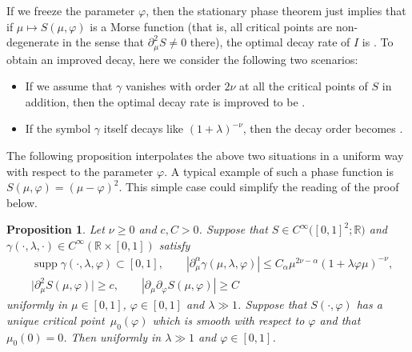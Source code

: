 \documentclass[10pt,a4paper]{amsart}
\numberwithin{equation}{section}
\newtheorem{Proposition}[Theorem]{Proposition}
 { \theoremstyle{definition}
\newtheorem{Definition}[Theorem]{Definition}
\newtheorem{Note}[Theorem]{Note}
\newtheorem{Example}[Theorem]{Example}
\newtheorem{Remark}[Theorem]{Remark} }
\def\R{\mathbb{R}}%
\DeclareMathOperator{\supp}{supp}%
\def\a{\alpha}
\def\c{\gamma}
\def\f{\varphi}
\def\l{\lambda}
\def\m{\mu}
\def\n{\nu}
\def\pa{\partial}
\begin{document}
If we freeze the parameter $\f$, then the stationary phase theorem just implies that if $\m\mapsto S(\m,\f)$ is a Morse function (that is, all critical points are non-degenerate in the sense that $\pa_{\m}^2S\neq 0$ there), the optimal decay rate of $I$ is \smash{$\l^{-\frac{1}{2}}$}. To obtain an improved decay, here we consider the following two scenarios:
\begin{itemize}\itemsep=0pt
\item If we assume that $\c$ vanishes with order $2\n$ at all the critical points of $S$ in addition, then the optimal decay rate is improved to be \smash{$\l^{-\frac{1}{2}-\n}$}.
\item If the symbol $\c$ itself decays like $(1+\l)^{-\n}$, then the decay order becomes \smash{$\l^{-\frac{1}{2}-\n}$}.
\end{itemize}
The following proposition interpolates the above two situations in a uniform way with respect to the parameter $\f$.
A typical example of such a phase function is $S(\m,\f)=(\m-\f)^2$. This simple case could simplify the reading of the proof below.

\begin{Proposition}\label{Stphasemovecrit}
Let $\n\geq 0$ and $c, C>0$. Suppose that $S\in C^{\infty}\bigl([0,1]^2;\R\bigr)$ and $\c(\cdot,\l,\cdot)\in C^{\infty}(\R\times [0,1])$ satisfy
\begin{align*}
&\supp \c(\cdot,\l,\f)\subset [0,1],\qquad |\pa_{\m}^{\a}\c(\m,\l,\f)|\leq C_{\a}\m^{2\n-\a}(1+\l \f\m)^{-\n},\\
&
\big|\pa_{\m}^2S(\m,\f)\big|\geq c,\qquad |\pa_{\m}\pa_{\f}S(\m,\f)|\geq C%
\end{align*}
uniformly in $\m\in [0,1]$, $\f\in [0,1]$ and $\l\gg 1$. Suppose that $S(\cdot,\f)$ has a unique critical point~${\m_0(\f)}$ which is smooth with respect to $\f$ and that $\m_0(0)=0$. Then
 \smash{$|I(\l,\f)|\lesssim \l^{-\n-\frac{1}{2}}$} uniformly in $\l\gg 1$ and $\f\in [0,1]$.
\end{Proposition}
\end{document}
